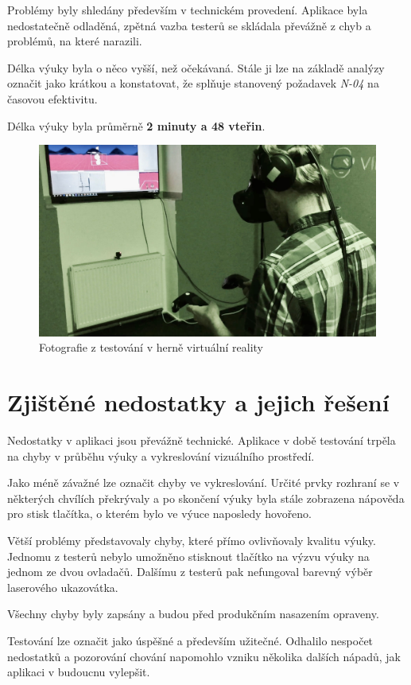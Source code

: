 Problémy byly shledány především v technickém provedení. Aplikace 
byla nedostatečně odladěná, zpětná vazba testerů se skládala 
převážně z chyb a problémů, na které narazili.

Délka výuky byla o něco vyšší, než očekávaná. Stále ji lze na základě analýzy označit
jako krátkou a konstatovat, že splňuje stanovený požadavek \emph{N-04} na časovou efektivitu.

Délka výuky byla průměrně \textbf{2 minuty a 48 vteřin}.

\begin{figure}
\centering
\includegraphics[width=12cm]{src/assets/testing.jpg}
\caption{Fotografie z testování v herně virtuální reality}
\end{figure}

\section{Zjištěné nedostatky a jejich řešení}\label{zjiux161tux11bnuxe9-nedostatky}

Nedostatky v aplikaci jsou převážně technické. Aplikace v době testování trpěla na
chyby v průběhu výuky a vykreslování vizuálního prostředí.

Jako méně závažné lze označit chyby ve vykreslování. Určité prvky rozhraní se v některých
chvílích překrývaly a po skončení výuky byla stále zobrazena nápověda pro stisk
tlačítka, o kterém bylo ve výuce naposledy hovořeno.

Větší problémy představovaly chyby, které přímo ovlivňovaly kvalitu 
výuky. Jednomu z testerů nebylo umožněno stisknout tlačítko na výzvu 
výuky na jednom ze dvou ovladačů. Dalšímu z testerů pak nefungoval 
barevný výběr laserového ukazovátka.

Všechny chyby byly zapsány a budou před produkčním nasazením opraveny.

Testování lze označit jako úspěšné a především užitečné. Odhalilo 
nespočet nedostatků a pozorování chování napomohlo vzniku
několika dalších nápadů, jak aplikaci v budoucnu vylepšit.
